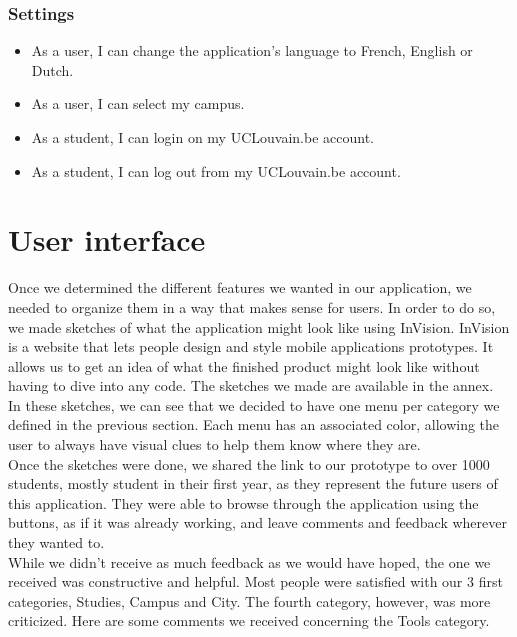 \documentclass[11pt, a4paper]{report}
\begin{document}
\subsubsection{Settings}

\begin{itemize}
\item As a user, I can change the application's language to French, English or Dutch.
\item As a user, I can select my campus.
\item As a student, I can login on my UCLouvain.be account.
\item As a student, I can log out from my UCLouvain.be account. 
\end{itemize}

\section{User interface}

Once we determined the different features we wanted in our application, we needed to organize them in a way that makes sense for users. In order to do so, we made sketches of what the application might look like using InVision. InVision is a website that lets people design and style mobile applications prototypes. It allows us to get an idea of what the finished product might look like without having to dive into any code. The sketches we made are available in the annex.\\

In these sketches, we can see that we decided to have one menu per category we defined in the previous section. Each menu has an associated color, allowing the user to always have visual clues to help them know where they are.\\

Once the sketches were done, we shared the link to our prototype to over 1000 students, mostly student in their first year, as they represent the future users of this application. They were able to browse through the application using the buttons, as if it was already working, and leave comments and feedback wherever they wanted to.\\

While we didn't receive as much feedback as we would have hoped, the one we received was constructive and helpful. Most people were satisfied with our 3 first categories, Studies, Campus and City. The fourth category, however, was more criticized. Here are some comments we received concerning the Tools category.\\
\end{document}
